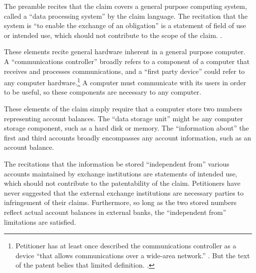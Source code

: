 \documentclass{scotus}
\begin{document}

The preamble recites that the claim covers a general purpose computing system,
called a ``data processing system'' by the claim language. The recitation that
the system is ``to enable the exchange of an obligation'' is a statement of
field of use or intended use, which should not contribute to the scope of the
claim.
.


These elements recite general hardware inherent in a general purpose computer. A
``communications controller'' broadly refers to a component of a computer that
receives and processes communications, and a ``first party device'' could refer
to any computer hardware.\footnote{Petitioner has at least once
described the communications controller as a device ``that allows communications
over a wide-area network.'' . But the text of the
patent belies that limited definition. .} A computer must communicate with its users in order to be useful,
so these components are necessary to any computer.


These elements of the claim simply require that a computer store two numbers
representing account balances. The ``data storage unit'' might be any computer
storage component, such as a hard disk or memory. The ``information about'' the
first and third accounts broadly encompasses any account information, such as an
account balance.

The recitations that the information be stored ``independent from'' various
accounts maintained by exchange institutions are statements of intended
use, which should not contribute to the patentability of the claim. Petitioners
have never suggested that the external exchange institutions are necessary
parties to infringement of their claims. Furthermore, so long as the two stored
numbers reflect actual account balances in external banks, the ``independent
from'' limitations are satisfied.
\end{document}

